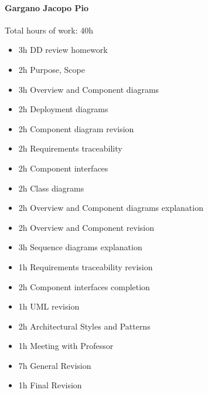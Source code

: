 \documentclass{report}
\begin{document}
		\paragraph{Gargano Jacopo Pio} Total hours of work: 40h
			\begin{itemize}
				\item 3h DD review homework
				\item 2h Purpose, Scope
				\item 3h Overview and Component diagrams
				\item 2h Deployment diagrams
				\item 2h Component diagram revision
				\item 2h Requirements traceability
				\item 2h Component interfaces
				\item 2h Class diagrams
				\item 2h Overview and Component diagrams explanation
				\item 2h Overview and Component revision
				\item 3h Sequence diagrams explanation
				\item 1h Requirements traceability revision
				\item 2h Component interfaces completion
				\item 1h UML revision
				\item 2h Architectural Styles and Patterns
				\item 1h Meeting with Professor
				\item 7h General Revision
				\item 1h Final Revision
			\end{itemize}
\end{document}

